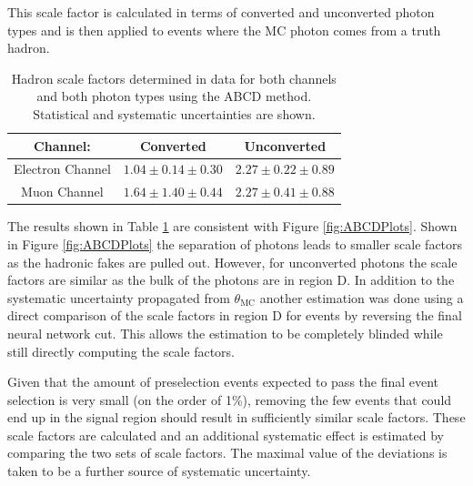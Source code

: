 This scale factor is calculated in terms of converted and unconverted photon types and is then applied to events where the MC photon comes from a truth hadron.


\begin{table}[h]
\begin{center}
{\renewcommand{\arraystretch}{1.2}
\begin{tabular}{c|c|c}
\hline
Channel:     & Converted& Unconverted  \\  \hline 
Electron Channel  & $1.04\pm 0.14 \pm 0.30$     &   $2.27\pm 0.22 \pm 0.89$	\\ 
Muon Channel        & $1.64 \pm 1.40 \pm 0.44$   &   $2.27 \pm 0.41 \pm 0.88$\\ \hline %
\end{tabular}
\caption{Hadron scale factors determined in data for both channels and both photon types using the ABCD method.  Statistical and systematic uncertainties are shown. }
\label{tab:abcdSF}
}
\end{center}
\end{table}

The results shown in Table \ref{tab:abcdSF} are consistent with Figure \ref{fig:ABCDPlots}.  Shown in Figure \ref{fig:ABCDPlots} the separation of photons leads to smaller scale factors as the hadronic fakes are pulled out.  However, for unconverted photons the scale factors are similar as the bulk of the photons are in region D.  In addition to the systematic uncertainty propagated from $\theta_\text{MC}$ another estimation was done using a direct comparison of the scale factors in region D for events by reversing the final neural network cut.  This allows the estimation to be completely blinded while still directly computing the scale factors. 

Given that the amount of preselection events expected to pass the final event selection is very small (on the order of 1\%), removing the few events that could end up in the signal region should result in sufficiently similar scale factors.  These scale factors are calculated and an additional systematic effect is estimated by comparing the two sets of scale factors.  The maximal value of the deviations is taken to be a further source of systematic uncertainty. 

